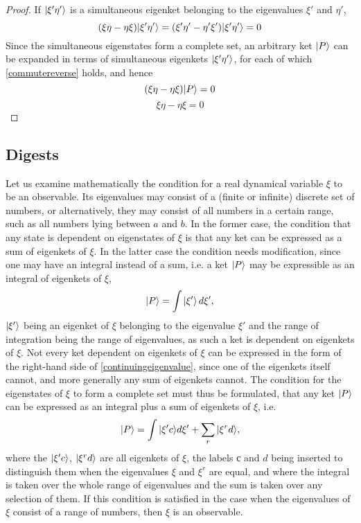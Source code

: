 \begin{proof}
If $| \xi'\eta' \rangle$ is a simultaneous eigenket belonging to the eigenvalues $\xi'$ and $\eta'$,
\begin{equation}
(\xi\eta-\eta\xi) | \xi'\eta' \rangle = (\xi'\eta'-\eta'\xi') | \xi'\eta' \rangle =0
\label{commutereverse}
\end{equation}
Since the simultaneous eigenstates form a complete set, an arbitrary ket $| P \rangle$ can be expanded in terms of simultaneous eigenkets $| \xi'\eta' \rangle$, for each of which \ref{commutereverse} holds, and hence 
\begin{equation}
(\xi\eta-\eta\xi)| P \rangle = 0
\end{equation}
\begin{equation}
\xi \eta - \eta \xi =0
\end{equation}
\end{proof}
\subsection{Digests}

Let us examine mathematically the condition for a real dynamical variable $\xi$ to be an observable. Its eigenvalues may consist of a (finite or infinite) discrete set of numbers, or alternatively, they may consist of all numbers in a certain range, such as all numbers lying between $a$ and $b$. In the former case, the condition that
any state is dependent on eigenstates of $\xi$ is that any ket can be expressed as a sum of eigenkets of  $\xi$. In the latter case the condition needs modification, since one may have an integral instead of a sum, i.e. a ket $| P \rangle$ may be expressible as an integral of eigenkets of $\xi$,
\begin{equation}
| P \rangle = \int | \xi' \rangle\, d\xi',
\label{continuingeigenvalue}
\end{equation}
$| \xi' \rangle$ being an eigenket of $\xi$ belonging to the eigenvalue $\xi'$ and the range of integration being the range of eigenvalues, as such a ket is dependent on eigenkets of $\xi$. Not every ket dependent on eigenkets of $\xi$ can be expressed in the form of the right-hand side of \ref{continuingeigenvalue}, since one of the eigenkets itself cannot, and more generally any sum of eigenkets cannot. The condition for the eigenstates of $\xi$ to form a complete set must thus be formulated, that any ket $| P \rangle$ can be expressed as an integral plus a sum of eigenkets of $\xi$, i.e.
\begin{equation}
| P \rangle = \int | \xi'c \rangle d \xi' + \sum_r | \xi ^r d \rangle,
\label{extension}
\end{equation}
where the $| \xi' c \rangle$, $| \xi^r d \rangle$ are all eigenkets of $\xi$, the labels $с$ and $d$ being inserted to distinguish them when the eigenvalues $\xi$ and $\xi^r$ are equal, and where the integral is taken over the whole range of eigenvalues
and the sum is taken over any selection of them. If this condition is satisfied in the case when the eigenvalues of $\xi$ consist of a range of numbers, then $\xi$ is an observable.

